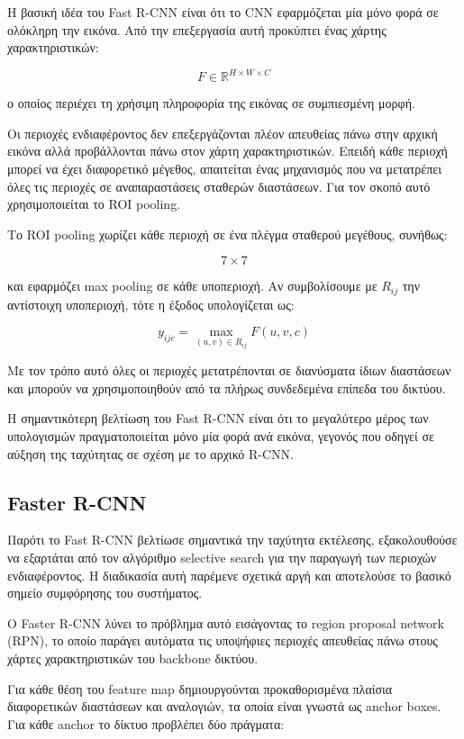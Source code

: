 \documentclass[12pt]{article}
\begin{document}
Η βασική ιδέα του Fast R-CNN είναι ότι το CNN εφαρμόζεται μία μόνο φορά σε ολόκληρη την εικόνα. Από την επεξεργασία αυτή προκύπτει ένας 
χάρτης χαρακτηριστικών:

\[
F \in \mathbb{R}^{H \times W \times C}
\]

ο οποίος περιέχει τη χρήσιμη πληροφορία της εικόνας σε συμπιεσμένη μορφή.

Οι περιοχές ενδιαφέροντος δεν επεξεργάζονται πλέον απευθείας πάνω στην αρχική εικόνα αλλά προβάλλονται πάνω στον χάρτη χαρακτηριστικών. 
Επειδή κάθε περιοχή μπορεί να έχει διαφορετικό μέγεθος, απαιτείται ένας μηχανισμός που να μετατρέπει όλες τις περιοχές σε αναπαραστάσεις σταθερών 
διαστάσεων. Για τον σκοπό αυτό χρησιμοποιείται το ROI pooling.

Το ROI pooling χωρίζει κάθε περιοχή σε ένα πλέγμα σταθερού μεγέθους, συνήθως:

\[
7 \times 7
\]

και εφαρμόζει max pooling σε κάθε υποπεριοχή. Αν συμβολίσουμε με $R_{ij}$ την αντίστοιχη υποπεριοχή, τότε η έξοδος υπολογίζεται ως:

\[
y_{ijc} = \max_{(u,v)\in R_{ij}} F(u,v,c)
\]

Με τον τρόπο αυτό όλες οι περιοχές μετατρέπονται σε διανύσματα ίδιων διαστάσεων και μπορούν να χρησιμοποιηθούν από τα πλήρως συνδεδεμένα 
επίπεδα του δικτύου.

Η σημαντικότερη βελτίωση του Fast R-CNN είναι ότι το μεγαλύτερο μέρος των υπολογισμών πραγματοποιείται μόνο μία φορά ανά εικόνα, γεγονός που 
οδηγεί σε αύξηση της ταχύτητας σε σχέση με το αρχικό R-CNN.

\subsection{Faster R-CNN}

Παρότι το Fast R-CNN βελτίωσε σημαντικά την ταχύτητα εκτέλεσης, εξακολουθούσε να εξαρτάται από τον αλγόριθμο selective search για την παραγωγή των 
περιοχών ενδιαφέροντος. Η διαδικασία αυτή παρέμενε σχετικά αργή και αποτελούσε το βασικό σημείο συμφόρησης του συστήματος.

Ο Faster R-CNN λύνει το πρόβλημα αυτό εισάγοντας το region proposal network (RPN), το οποίο παράγει αυτόματα τις υποψήφιες περιοχές απευθείας πάνω 
στους χάρτες χαρακτηριστικών του backbone δικτύου.

Για κάθε θέση του feature map δημιουργούνται προκαθορισμένα πλαίσια διαφορετικών διαστάσεων και αναλογιών, τα οποία είναι γνωστά ως anchor boxes. 
Για κάθε anchor το δίκτυο προβλέπει δύο πράγματα:
\end{document}
